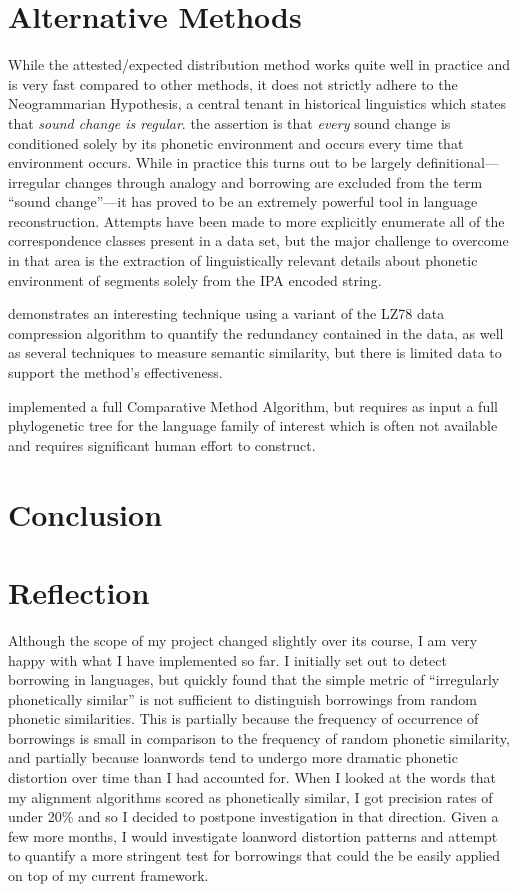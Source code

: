 \documentclass[doc,natbib,12pt]{apa6}
\begin{document}
\section{Alternative Methods}

While the attested/expected distribution method works quite well in practice and is very fast compared to other methods, it does not strictly adhere to the Neogrammarian Hypothesis, a central tenant in historical linguistics which states that \emph{sound change is regular}. the assertion is that \emph{every} sound change is conditioned solely by its phonetic environment and occurs every time that environment occurs. While in practice this turns out to be largely definitional---irregular changes through analogy and borrowing are excluded from the term ``sound change''---it has proved to be an extremely powerful tool in language reconstruction. Attempts have been made to more explicitly enumerate all of the correspondence classes present in a data set, but the major challenge to overcome in that area is the extraction of linguistically relevant details about phonetic environment of segments solely from the IPA encoded string. 

\citet{Steiner2011} demonstrates an interesting technique using a variant of the LZ78 data compression algorithm to quantify the redundancy contained in the data, as well as several techniques to measure semantic similarity, but there is limited data to support the method's effectiveness. 

\citet{Gilman2013} implemented a full Comparative Method Algorithm, but requires as input a full phylogenetic tree for the language family of interest which is often not available and requires significant human effort to construct. 

\section{Conclusion}




\section{Reflection}

Although the scope of my project changed slightly over its course, I am very happy with what I have implemented so far. I initially set out to detect borrowing in languages, but quickly found that the simple metric of ``irregularly phonetically similar'' is not sufficient to distinguish borrowings from random phonetic similarities. This is partially because the frequency of occurrence of borrowings is small in comparison to the frequency of random phonetic similarity, and partially because loanwords tend to undergo more dramatic phonetic distortion over time than I had accounted for. When I looked at the words that my alignment algorithms scored as phonetically similar, I got precision rates of under 20\% and so I decided to postpone investigation in that direction. Given a few more months, I would investigate loanword distortion patterns and attempt to quantify a more stringent test for borrowings that could the be easily applied on top of my current framework. 
\end{document}
